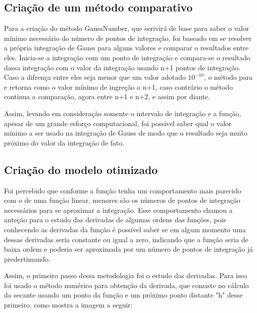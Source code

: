 \documentclass[12pt,a4paper]{article}
\begin{document}
\subsection{Criação de um método comparativo}

\qquad Para a criação do método GaussNumber, que serivirá de base para saber o valor mínimo necessário do número de pontos de integração, foi baseado em se resolver a própria integração de Gauss para alguns valores e comparar o resultados entre eles. Inicia-se a integração com um ponto de integração e compara-se o resultado dassa integração com o valor da integração usando n+1 pontos de integração. Caso a difrença entre eles seja menor que um valor adotado $10^{-10}$, o método para e retorna como o valor mínimo de ingreção o n+1, caso contrário o método continua a comparação, agora entre n+1 e n+2, e assim por diante.

Assim, levando em consideração somente o intervalo de integração e a função, apesar de um grande esforço computacional, foi possível saber qual o valor mínimo a ser usado na integração de Gauss de modo que o resultado seja muito próximo do valor da integração de fato.

\newpage
\subsection{Criação do modelo otimizado}
\qquad Foi percebido que conforme a função tenha um comportamento mais parecido com o de uma função linear, menores são os números de pontos de integração necessários para se aproximar a integração. Esse comportamento chamou a anteção para o estudo das derivadas de algumas ordens das funções, pois conhecendo as derivadas da função é possível saber se em algum momento uma dessas derivadas seria constante ou igual a zero, indicando que a função seria de baixa ordem e poderia ser aproximada por um número de pontos de integração já predertimando.

Assim, o primeiro passo dessa metodologia foi o estudo das derivadas. Para isso foi usado o método numérico para obtenção da derivada, que consiste no cálculo da secante usando um ponto da função e um próximo ponto distante "h" desse primeiro, como mostra a imagem a seguir:
\end{document}
